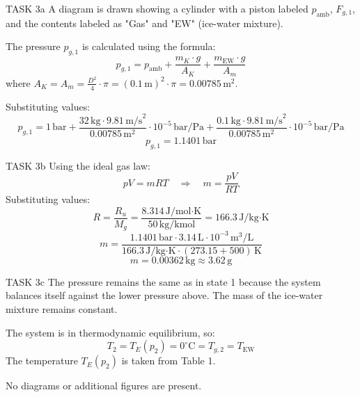 TASK 3a  
A diagram is drawn showing a cylinder with a piston labeled \( p_{\text{amb}} \), \( F_{g,1} \), and the contents labeled as "Gas" and "EW" (ice-water mixture).  

The pressure \( p_{g,1} \) is calculated using the formula:  
\[
p_{g,1} = p_{\text{amb}} + \frac{m_K \cdot g}{A_K} + \frac{m_{\text{EW}} \cdot g}{A_m}
\]  
where \( A_K = A_m = \frac{D^2}{4} \cdot \pi = (0.1 \, \text{m})^2 \cdot \pi = 0.00785 \, \text{m}^2 \).  

Substituting values:  
\[
p_{g,1} = 1 \, \text{bar} + \frac{32 \, \text{kg} \cdot 9.81 \, \text{m/s}^2}{0.00785 \, \text{m}^2} \cdot 10^{-5} \, \text{bar/Pa} + \frac{0.1 \, \text{kg} \cdot 9.81 \, \text{m/s}^2}{0.00785 \, \text{m}^2} \cdot 10^{-5} \, \text{bar/Pa}
\]  
\[
p_{g,1} = 1.1401 \, \text{bar}
\]  

TASK 3b  
Using the ideal gas law:  
\[
pV = mRT \quad \Rightarrow \quad m = \frac{pV}{RT}
\]  
Substituting values:  
\[
R = \frac{R_u}{M_g} = \frac{8.314 \, \text{J/mol·K}}{50 \, \text{kg/kmol}} = 166.3 \, \text{J/kg·K}
\]  
\[
m = \frac{1.1401 \, \text{bar} \cdot 3.14 \, \text{L} \cdot 10^{-3} \, \text{m}^3/\text{L}}{166.3 \, \text{J/kg·K} \cdot (273.15 + 500) \, \text{K}}
\]  
\[
m = 0.00362 \, \text{kg} \approx 3.62 \, \text{g}
\]  

TASK 3c  
The pressure remains the same as in state 1 because the system balances itself against the lower pressure above. The mass of the ice-water mixture remains constant.  

The system is in thermodynamic equilibrium, so:  
\[
T_2 = T_E(p_2) = 0^\circ\text{C} = T_{g,2} = T_{\text{EW}}
\]  
The temperature \( T_E(p_2) \) is taken from Table 1.  

No diagrams or additional figures are present.